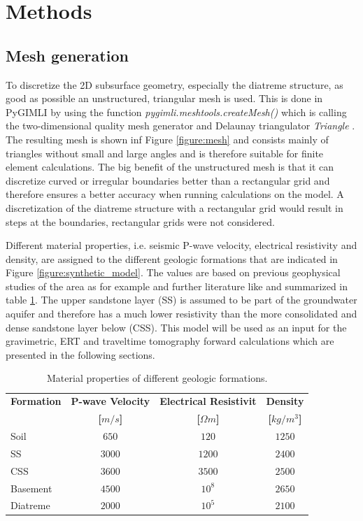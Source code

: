 \section{Methods}\label{section:Methods}

\subsection{Mesh generation}\label{section:Mesh}
To discretize the 2D subsurface geometry, especially the diatreme structure, as good as possible an unstructured, triangular mesh is used. This is done in PyGIMLI by using the function \textit{pygimli.meshtools.createMesh()} which is calling the two-dimensional quality mesh generator and Delaunay triangulator \textit{Triangle} \citep{shewchuk1996triangle}. The resulting mesh is shown inf Figure \ref{figure:mesh} and consists mainly of triangles without small and large angles and is therefore suitable for finite element calculations. The big benefit of the unstructured mesh is that it can discretize curved or irregular boundaries better than a rectangular grid and therefore ensures a better accuracy when running calculations on the model. A discretization of the diatreme structure with a rectangular grid would result in steps at the boundaries, rectangular grids were not considered.

Different material properties, i.e. seismic P-wave velocity, electrical resistivity and density, are assigned to the  different geologic formations that are indicated in Figure \ref{figure:synthetic_model}. The values are based on previous geophysical studies of the area as for example \citet{NiklasPlumpe.2015,TimGilberti.2020} and further literature like \citet{geldart2004problems,palacky1988resistivity} and summarized in table \ref{table:properties}. The upper sandstone layer (SS) is assumed to be part of the groundwater aquifer and therefore has a much lower resistivity than the more consolidated and dense sandstone layer below (CSS). This model will be used as an input for the gravimetric, ERT and traveltime tomography forward calculations which are presented in the following sections.

\begin{table}[]
\caption{Material properties of different geologic formations.}
\centering
\begin{tabular}{lccc}
\hline 
\textbf{Formation} & \textbf{P-wave Velocity}  & \textbf{Electrical Resistivit}  & \textbf{Density}  \\
& \textbf{[$m/s$]}  & \textbf{[$\Omega m$]}  & \textbf{[$kg/m^3$]}\\ \hline 
Soil & $650$ & $120$ & $1250$\\
SS & $3000$ & $1200$ & $2400$\\
CSS & $3600$ & $3500$ & $2500$\\
Basement & $4500$ & $10^8$ & $2650$\\
Diatreme & $2000$ & $10^5$ & $2100$\\
 \hline 
\end{tabular}
\label{table:properties}
\end{table}


